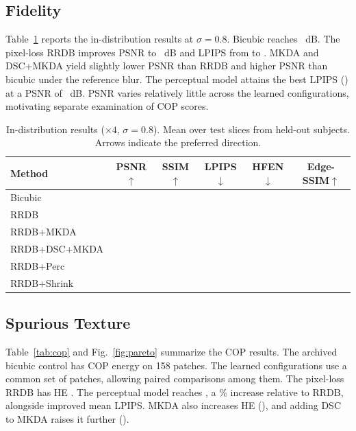 \documentclass[journal]{IEEEtran}
\begin{document}
\subsection{Fidelity}
Table~\ref{tab:main} reports the in-distribution results at $\sigma=0.8$. Bicubic reaches \PSNRbic{}~dB. The pixel-loss RRDB improves PSNR to \PSNRrrdb{}~dB and LPIPS from \LPIPSbic{} to \LPIPSrrdb{}. MKDA and DSC+MKDA yield slightly lower PSNR than RRDB and higher PSNR than bicubic under the reference blur. The perceptual model attains the best LPIPS (\LPIPSperc{}) at a PSNR of \PSNRperc{}~dB. PSNR varies relatively little across the learned configurations, motivating separate examination of COP scores.

\begin{table}[!t]
\centering
\caption{In-distribution results ($\times4$, $\sigma=0.8$). Mean over \numTestSlices{} test slices from \numTestSubjects{} held-out subjects. Arrows indicate the preferred direction.}
\label{tab:main}
\begin{tabular}{lccccc}
\toprule
Method & PSNR$\uparrow$ & SSIM$\uparrow$ & LPIPS$\downarrow$ & HFEN$\downarrow$ & Edge-SSIM$\uparrow$ \\
\midrule
Bicubic        & \PSNRbic{} & \SSIMbic{} & \LPIPSbic{} & \HFENbic{} & \EDGEbic{} \\
RRDB           & \PSNRrrdb{} & \SSIMrrdb{} & \LPIPSrrdb{} & \HFENrrdb{} & \EDGErrdb{} \\
RRDB+MKDA      & \PSNRrrdbmkda{} & \SSIMrrdbmkda{} & \LPIPSrrdbmkda{} & \HFENrrdbmkda{} & \EDGErrdbmkda{} \\
RRDB+DSC+MKDA  & \PSNRtrust{} & \SSIMtrust{} & \LPIPStrust{} & \HFENtrust{} & \EDGEtrust{} \\
RRDB+Perc      & \PSNRperc{} & \SSIMperc{} & \LPIPSperc{} & \HFENperc{} & \EDGEperc{} \\
RRDB+Shrink    & \PSNRshr{} & \SSIMshr{} & \LPIPSshr{} & \HFENshr{} & \EDGEshr{} \\
\bottomrule
\end{tabular}
\end{table}

\subsection{Spurious Texture}
Table~\ref{tab:cop} and Fig.~\ref{fig:pareto} summarize the COP results. The archived bicubic control has COP energy \HEbic{} on 158 patches. The learned configurations use a common set of \ArchivePatches{} patches, allowing paired comparisons among them. The pixel-loss RRDB has HE \HErrdb{}. The perceptual model reaches \HEperc{}, a \HEpercPct{}\% increase relative to RRDB, alongside improved mean LPIPS. MKDA also increases HE (\HErrdbmkda{}), and adding DSC to MKDA raises it further (\HEtrust{}).
\end{document}

